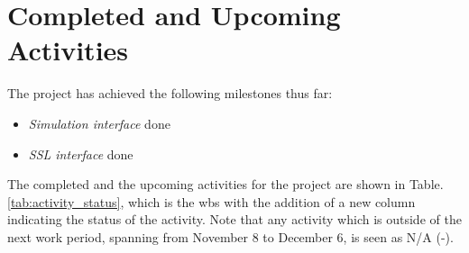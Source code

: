 \section{Completed and Upcoming Activities}

The project has achieved the following milestones thus far:
\begin{itemize}
    \item \textit{Simulation interface} done
    \item \textit{SSL interface} done
\end{itemize}
The completed and the upcoming activities for the project are shown in Table.\:\ref{tab:activity_status}, which is the \ac{wbs} with the addition of a new column indicating the status of the activity. Note that any activity which is outside of the next work period, spanning from November 8 to December 6, is seen as N/A (-).

